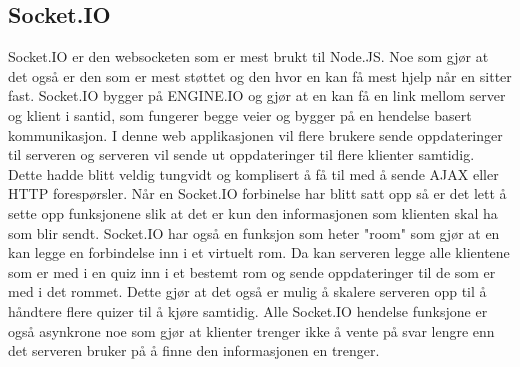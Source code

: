 \subsection{Socket.IO}
Socket.IO er den websocketen som er mest brukt til Node.JS. Noe som gjør at det også er den som er 
mest støttet og den hvor en kan få mest hjelp når en sitter fast. Socket.IO bygger på ENGINE.IO og gjør at en
kan få en link mellom server og klient i santid, som fungerer begge veier og bygger på en hendelse basert 
kommunikasjon. I denne web applikasjonen vil flere brukere sende oppdateringer til serveren og serveren 
vil sende ut oppdateringer til flere klienter samtidig. Dette hadde blitt veldig tungvidt og komplisert
å få til med å sende AJAX eller HTTP forespørsler. Når en Socket.IO forbinelse har blitt satt opp så
er det lett å sette opp funksjonene slik at det er kun den informasjonen som klienten skal ha som blir sendt.
Socket.IO har også en funksjon som heter "room" som gjør at en kan legge en forbindelse inn i et virtuelt rom.
Da kan serveren legge alle klientene som er med i en quiz inn i et bestemt rom og sende oppdateringer til de 
som er med i det rommet. Dette gjør at det også er mulig å skalere serveren opp til å håndtere flere quizer til
å kjøre samtidig. Alle Socket.IO hendelse funksjone er også asynkrone noe som gjør at klienter trenger ikke å
vente på svar lengre enn det serveren bruker på å finne den informasjonen en trenger.